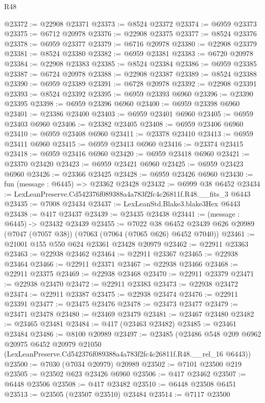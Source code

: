 \begin{lexlean}{R48}
\begin{coremodule}
@23372 := @22908 @23371
@23373 := @8524 @23372
@23374 := @6959 @23373
@23375 := @6712 @20978
@23376 := @22908 @23375
@23377 := @8524 @23376
@23378 := @6959 @23377
@23379 := @6716 @20978
@23380 := @22908 @23379
@23381 := @8524 @23380
@23382 := @6959 @23381
@23383 := @6720 @20978
@23384 := @22908 @23383
@23385 := @8524 @23384
@23386 := @6959 @23385
@23387 := @6724 @20978
@23388 := @22908 @23387
@23389 := @8524 @23388
@23390 := @6959 @23389
@23391 := @6728 @20978
@23392 := @22908 @23391
@23393 := @8524 @23392
@23395 := @6959 @23393 @6960
@23396 := @23390 @23395
@23398 := @6959 @23396 @6960
@23400 := @6959 @23398 @6960
@23401 := @23386 @23400
@23403 := @6959 @23401 @6960
@23405 := @6959 @23403 @6960
@23406 := @23382 @23405
@23408 := @6959 @23406 @6960
@23410 := @6959 @23408 @6960
@23411 := @23378 @23410
@23413 := @6959 @23411 @6960
@23415 := @6959 @23413 @6960
@23416 := @23374 @23415
@23418 := @6959 @23416 @6960
@23420 := @6959 @23418 @6960
@23421 := @23370 @23420
@23423 := @6959 @23421 @6960
@23425 := @6959 @23423 @6960
@23426 := @23366 @23425
@23428 := @6959 @23426 @6960
@23430 := fun (message : @6445) => @23362 @23428
@23432 := @6999 @38 @6452
@23434 := LexLeanPreserve.Cd542376f089388a4a783f2fc4c26811f.R48.__fits_3 @6443
@23435 := @7008 @23434
@23437 := LexLeanStd.Blake3.blake3Hex @6443
@23438 := @417 @23437
@23439 := @23435 @23438
@23441 := (message : @6445) -> @23432 @23439
@23455 := @7022
    @38
    @6452
    @23439
    @626
    @20989
    (@7047 (@7057 @38))
    (@7063 (@7064 (@7065 @626) @6452 @7040))
@23461 := @21001 @155 @550 @624 @23361 @23428 @20979
@23462 := @22911 @23363
@23463 := @22938 @23462
@23464 := @22911 @23367
@23465 := @22938 @23464
@23466 := @22911 @23371
@23467 := @22938 @23466
@23468 := @22911 @23375
@23469 := @22938 @23468
@23470 := @22911 @23379
@23471 := @22938 @23470
@23472 := @22911 @23383
@23473 := @22938 @23472
@23474 := @22911 @23387
@23475 := @22938 @23474
@23476 := @22911 @23391
@23477 := @23475 @23476
@23478 := @23473 @23477
@23479 := @23471 @23478
@23480 := @23469 @23479
@23481 := @23467 @23480
@23482 := @23465 @23481
@23484 := @417 (@23463 @23482)
@23485 := @23461 @23484
@23486 := @8100 @20989
@23497 := @23485
    (@23486
      @548
      @209
      @6962
      @20975
      @6452
      @20979
      @21050
      (LexLeanPreserve.Cd542376f089388a4a783f2fc4c26811f.R48.__rel_16 @6443))
@23500 := @7030 (@7034 @20979) @20989
@23502 := @7101 @23500 @219
@23505 := @23502 @623 @23426 @6960
@23506 := @417 @23462
@23507 := @6448 @23506
@23508 := @417 @23482
@23510 := @6448 @23508 @6451
@23513 := @23505 (@23507 @23510) @23484
@23514 := @7117 @23500

\end{coremodule}
\end{lexlean}
